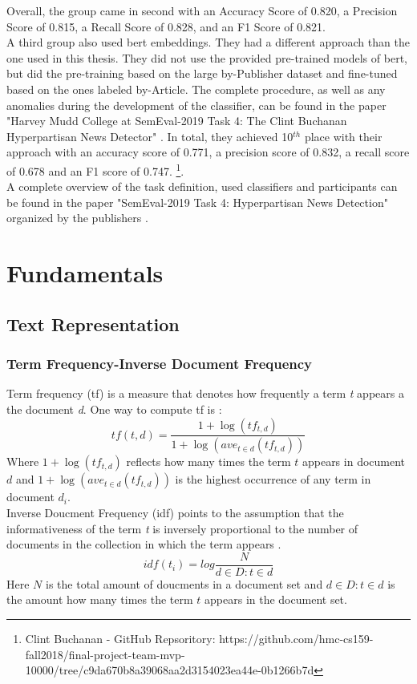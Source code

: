 \documentclass[a4paper, 11pt,titlepage,oneside,openany]{book}
\begin{document}
\newpage 
\noindent Overall, the group came in second with an Accuracy Score of 0.820, a Precision Score of 0.815, a Recall Score of 0.828, and an F1 Score of 0.821. \\
\indent A third group also used \gls{bert} embeddings. They had a different approach than the one used in this thesis. They did not use the provided pre-trained models of \gls{bert}, but did the pre-training based on the large by-Publisher dataset and fine-tuned based on the ones labeled by-Article. The complete procedure, as well as any anomalies during the development of the classifier, can be found in the paper "Harvey Mudd College at SemEval-2019 Task 4: The Clint Buchanan Hyperpartisan News Detector" \cite{bertgruppe}. In total, they achieved 10$^{th}$ place with their approach with an accuracy score of 0.771, a precision score of 0.832, a recall score of 0.678 and an F1 score of 0.747. \footnote{Clint Buchanan - GitHub Repsoritory: https://github.com/hmc-cs159-fall2018/final-project-team-mvp-10000/tree/c9da670b8a39068aa2d3154023ea44e-0b1266b7d}. \\
\indent A complete overview of the task definition, used classifiers and participants can be found in the paper "SemEval-2019 Task 4: Hyperpartisan News Detection" organized by the publishers \cite{hyperpartisannewsdetection}.


\chapter{Fundamentals}
\section{Text Representation}
\subsection{Term Frequency-Inverse Document Frequency}
\indent Term frequency (\gls{tf}) is a measure that denotes how frequently a term \textit{t} appears a the document \textit{d}. One way to compute \gls{tf} is \cite{IR-book}:\\
\[
tf(t,d)=\frac{1+\log(tf_{t,d})}{1+\log(ave_{t\in d}(tf_{t,d}))}
\]
Where $1+\log(tf_{t,d})$ reflects how many times the term $t$ appears in document $d$ and $1+\log(ave_{t\in d}(tf_{t,d}))$ is the highest occurrence of any term in document $d_i$.\\

\indent Inverse Doucment Frequency (\gls{idf}) points to the assumption that the informativeness of the term \textit{t} is inversely proportional to the number of documents in the collection in which the term appears \cite{IR-book}.\\
\[
idf(t_i)=log\frac{N}{d \in D : t \in d}
\]
Here $N$ is the total amount of doucments in a document set and $d \in D : t \in d$ is the amount how many times the term $t$ appears in the document set.\\
\end{document}
